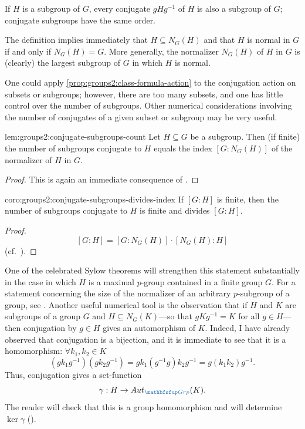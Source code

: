 If $H$ is a subgroup of $G$, every conjugate $gHg^{-1}$ of $H$ is also
a subgroup of $G$; conjugate subgroups have the same order.
\begin{rem}{}{}
  The definition implies immediately that $H \subseteq N_G(H)$ and
  that $H$ is normal in $G$ if and only if $N_G(H) = G$. More
  generally, the normalizer $N_G(H)$ of $H$ in $G$ is (clearly) the
  largest subgroup of $G$ in which $H$ is normal.
\end{rem}
One could apply \cref{prop:groups2:class-formula-action} to the
conjugation action on subsets or subgroups; however, there are too
many subsets, and one has little control over the number of
subgroups. Other numerical considerations involving the number of
conjugates of a given subset or subgroup may be very useful.
\begin{lem}{}{lem:groups2:conjugate-subgroups-count}
  Let $H \subseteq G$ be a subgroup. Then (if finite) the number of
  subgroups conjugate to $H$ equals the index $[G : N_G(H)]$ of the
  normalizer of $H$ in $G$.
\end{lem}
\begin{proof}
  This is again an immediate consequence of
  .
\end{proof}
\begin{coro}{}{coro:groups2:conjugate-subgroups-divides-index}
  If $[G : H]$ is finite, then the number of subgroups conjugate to
  $H$ is finite and divides $[G : H]$.
\end{coro}
\begin{proof}
  \[ [G : H] = [G : N_G(H)] \cdot [N_G(H) : H]
  \]
  (cf.\ ).
\end{proof}
One of the celebrated Sylow theorems will strengthen this statement
substantially in the case in which $H$ is a maximal $p$-group
contained in a finite group $G$. For a statement concerning the size
of the normalizer of an arbitrary $p$-subgroup of a group, see
.  Another useful numerical
tool is the observation that if $H$ and $K$ are subgroups of a group
$G$ and $H \subseteq N_G(K)$---so that $gKg^{-1} = K$ for all
$g \in H$---then conjugation by $g \in H$ gives an automorphism of
$K$. Indeed, I have already observed that conjugation is a bijection,
and it is immediate to see that it is a homomorphism:
$\forall k_1, k_2 \in K$
\[
  (gk_1 g^{-1})(gk_2 g^{-1}) = gk_1(g^{-1}g)k_2 g^{-1} = g(k_1
  k_2)g^{-1}.
\]
Thus, conjugation gives a set-function
\[
  \gamma : H \to \Aut_{\categ{Grp}}(K).
\]
The reader will check that this is a group homomorphism and will
determine $\ker\gamma$
().

